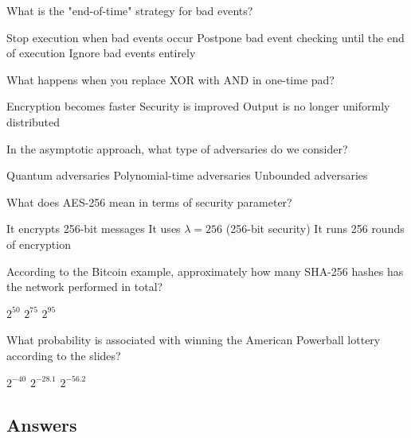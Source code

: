 \documentclass[10pt,a4paper,american]{exam}
\begin{document}
\begin{questions}
	\question What is the "end-of-time" strategy for bad events?
	\begin{randomizechoices}
		\choice Stop execution when bad events occur
		\CorrectChoice Postpone bad event checking until the end of execution
		\choice Ignore bad events entirely
	\end{randomizechoices}

	\question What happens when you replace XOR with AND in one-time pad?
	\begin{randomizechoices}
		\choice Encryption becomes faster
		\choice Security is improved
		\CorrectChoice Output is no longer uniformly distributed
	\end{randomizechoices}

	\question In the asymptotic approach, what type of adversaries do we consider?
	\begin{randomizechoices}
		\choice Quantum adversaries
		\CorrectChoice Polynomial-time adversaries
		\choice Unbounded adversaries
	\end{randomizechoices}

	\question What does AES-256 mean in terms of security parameter?
	\begin{randomizechoices}
		\choice It encrypts 256-bit messages
		\CorrectChoice It uses $\lambda = 256$ (256-bit security)
		\choice It runs 256 rounds of encryption
	\end{randomizechoices}

	\question According to the Bitcoin example, approximately how many SHA-256 hashes has the network performed in total?
	\begin{randomizechoices}
		\choice $2^{50}$
		\choice $2^{75}$
		\CorrectChoice $2^{95}$
	\end{randomizechoices}

	\question What probability is associated with winning the American Powerball lottery according to the slides?
	\begin{randomizechoices}
		\choice $2^{-40}$
		\CorrectChoice $2^{-28.1}$
		\choice $2^{-56.2}$
	\end{randomizechoices}

\end{questions}

\clearpage

\subsection*{Answers}
\printkeytable
\end{document}
